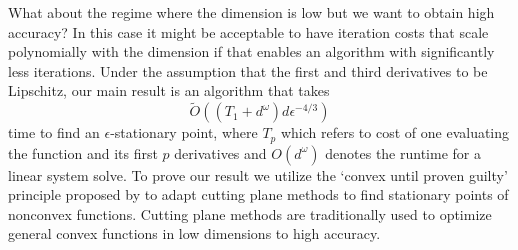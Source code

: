 \documentclass[12pt,final]{colt2018} %
\def\Dim{d}
\def\TimeGrad{T_{1}}
\def\TimeP{T_{p}}
\def\cite{\citet}
\begin{document}
What about the regime where the dimension is low but we want to obtain high accuracy? In this case it might be acceptable to have iteration costs that scale polynomially with the dimension if that enables an algorithm with significantly less iterations. Under the assumption that the first and third derivatives to be Lipschitz, our main result is an algorithm that takes
$$
\tilde{O}( ( \TimeGrad + \Dim^{\omega}) \Dim  \epsilon^{-4/3} )
$$
time to find an $\epsilon$-stationary point, where $\TimeP$ which refers to cost of one evaluating the function and its first $p$ derivatives and $O(d^{\omega})$ denotes the runtime for a linear system solve. To prove our result we utilize the `convex until proven guilty' principle proposed by \cite{carmon2017convex} to adapt cutting plane methods to find stationary points of nonconvex functions. Cutting plane methods are traditionally used to optimize general convex functions in low dimensions to high accuracy.
\end{document}
